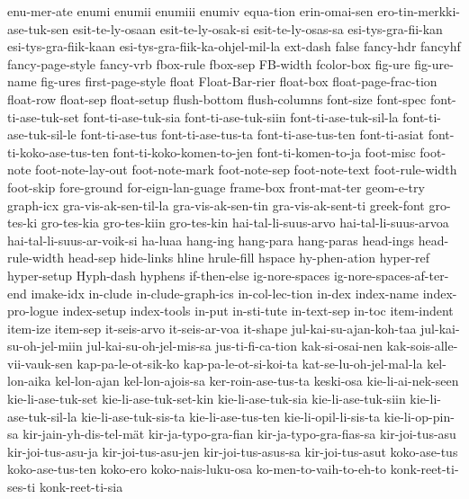 {  enu-mer-ate
  enumi
  enumii
  enumiii
  enumiv
  equa-tion
  erin-omai-sen
  ero-tin-merkki-ase-tuk-sen
  esit-te-ly-osaan
  esit-te-ly-osak-si
  esit-te-ly-osas-sa
  esi-tys-gra-fii-kan
  esi-tys-gra-fiik-kaan
  esi-tys-gra-fiik-ka-ohjel-mil-la
  ext-dash
  false
  fancy-hdr
  fancyhf
  fancy-page-style
  fancy-vrb
  fbox-rule
  fbox-sep
  FB-width
  fcolor-box
  fig-ure
  fig-ure-name
  fig-ures
  first-page-style
  float
  Float-Bar-rier
  float-box
  float-page-frac-tion
  float-row
  float-sep
  float-setup
  flush-bottom
  flush-columns
  font-size
  font-spec
  font-ti-ase-tuk-set
  font-ti-ase-tuk-sia
  font-ti-ase-tuk-siin
  font-ti-ase-tuk-sil-la
  font-ti-ase-tuk-sil-le
  font-ti-ase-tus
  font-ti-ase-tus-ta
  font-ti-ase-tus-ten
  font-ti-asiat
  font-ti-koko-ase-tus-ten
  font-ti-koko-komen-to-jen
  font-ti-komen-to-ja
  foot-misc
  foot-note
  foot-note-lay-out
  foot-note-mark
  foot-note-sep
  foot-note-text
  foot-rule-width
  foot-skip
  fore-ground
  for-eign-lan-guage
  frame-box
  front-mat-ter
  geom-e-try
  graph-icx
  gra-vis-ak-sen-til-la
  gra-vis-ak-sen-tin
  gra-vis-ak-sent-ti
  greek-font
  gro-tes-ki
  gro-tes-kia
  gro-tes-kiin
  gro-tes-kin
  hai-tal-li-suus-arvo
  hai-tal-li-suus-arvoa
  hai-tal-li-suus-ar-voik-si
  ha-luaa
  hang-ing
  hang-para
  hang-paras
  head-ings
  head-rule-width
  head-sep
  hide-links
  hline
  hrule-fill
  hspace
  hy-phen-ation
  hyper-ref
  hyper-setup
  Hyph-dash
  hyphens
  if-then-else
  ig-nore-spaces
  ig-nore-spaces-af-ter-end
  imake-idx
  in-clude
  in-clude-graph-ics
  in-col-lec-tion
  in-dex
  index-name
  index-pro-logue
  index-setup
  index-tools
  in-put
  in-sti-tute
  in-text-sep
  in-toc
  item-indent
  item-ize
  item-sep
  it-seis-arvo
  it-seis-ar-voa
  it-shape
  jul-kai-su-ajan-koh-taa
  jul-kai-su-oh-jel-miin
  jul-kai-su-oh-jel-mis-sa
  jus-ti-fi-ca-tion
  kak-si-osai-nen
  kak-sois-alle-vii-vauk-sen
  kap-pa-le-ot-sik-ko
  kap-pa-le-ot-si-koi-ta
  kat-se-lu-oh-jel-mal-la
  kel-lon-aika
  kel-lon-ajan
  kel-lon-ajois-sa
  ker-roin-ase-tus-ta
  keski-osa
  kie-li-ai-nek-seen
  kie-li-ase-tuk-set
  kie-li-ase-tuk-set-kin
  kie-li-ase-tuk-sia
  kie-li-ase-tuk-siin
  kie-li-ase-tuk-sil-la
  kie-li-ase-tuk-sis-ta
  kie-li-ase-tus-ten
  kie-li-opil-li-sis-ta
  kie-li-op-pin-sa
  kir-jain-yh-dis-tel-mät
  kir-ja-typo-gra-fian
  kir-ja-typo-gra-fias-sa
  kir-joi-tus-asu
  kir-joi-tus-asu-ja
  kir-joi-tus-asu-jen
  kir-joi-tus-asus-sa
  kir-joi-tus-asut
  koko-ase-tus
  koko-ase-tus-ten
  koko-ero
  koko-nais-luku-osa
  ko-men-to-vaih-to-eh-to
  konk-reet-ti-ses-ti
  konk-reet-ti-sia
}

